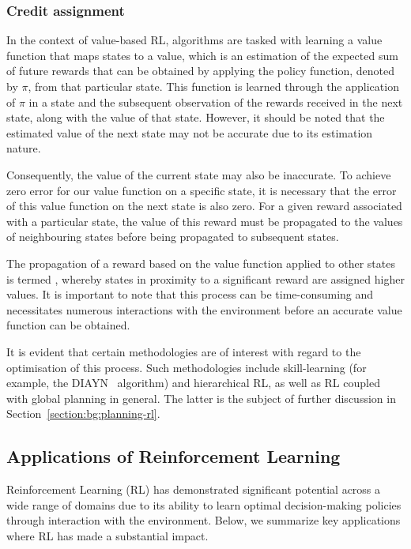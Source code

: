 \subsubsection{Credit assignment}

In the context of value-based RL, algorithms are tasked with learning a value function that maps states to a value,
which is an estimation of the expected sum of future rewards that can be obtained by applying the policy function,
denoted by $\pi$, from that particular state.
This function is learned through the application of $\pi$ in a state and the subsequent observation of the rewards
received in the next state, along with the value of that state.
However, it should be noted that the estimated value of the next state may not be accurate due to its estimation nature.

Consequently, the value of the current state may also be inaccurate.
To achieve zero error for our value function
on a specific state, it is necessary that the error of this value function on the next state is also zero.
For a given reward associated with a particular state, the value of this reward must be propagated to the values of neighbouring
states before being propagated to subsequent states.

The propagation of a reward based on the value function applied to other states is termed ,
whereby states in proximity to a significant reward are assigned higher values.
It is important to note that this process
can be time-consuming and necessitates numerous interactions with the environment before an accurate value function can
be obtained.

It is evident that certain methodologies are of interest with regard to the optimisation of this
process.
Such methodologies include skill-learning (for example, the DIAYN~\citep{eysenbach2018diversity} algorithm) and
hierarchical RL, as well as RL coupled with global planning in general.
The latter is the subject of further discussion in Section~\ref{section:bg:planning-rl}. %

\subsection{Applications of Reinforcement Learning}\label{subsection:bg:rl:applications-of-reinforcement-learning}
Reinforcement Learning (RL) has demonstrated significant potential across a wide range of domains due to its ability to learn optimal decision-making policies through interaction with the environment.
Below, we summarize key applications where RL has made a substantial impact.

